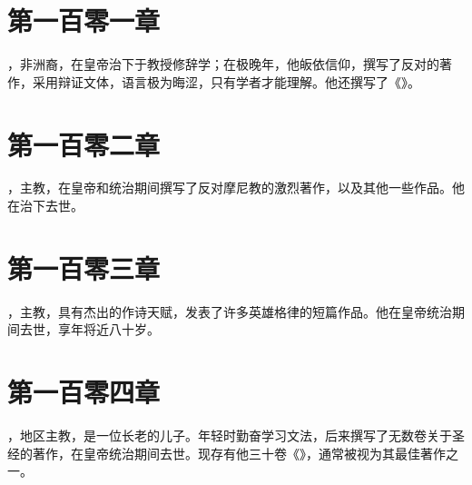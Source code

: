 
\section{第一百零一章}

，非洲裔，在皇帝治下于教授修辞学；在极晚年，他皈依信仰，撰写了反对的著作，采用辩证文体，语言极为晦涩，只有学者才能理解。他还撰写了《》。\par


\section{第一百零二章}

，主教，在皇帝和统治期间撰写了反对摩尼教的激烈著作，以及其他一些作品。他在治下去世。\par


\section{第一百零三章}

，主教，具有杰出的作诗天赋，发表了许多英雄格律的短篇作品。他在皇帝统治期间去世，享年将近八十岁。\par


\section{第一百零四章}

，地区主教，是一位长老的儿子。年轻时勤奋学习文法，后来撰写了无数卷关于圣经的著作，在皇帝统治期间去世。现存有他三十卷《》，通常被视为其最佳著作之一。\par


